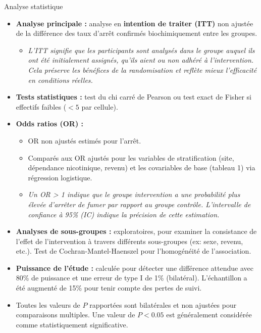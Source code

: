 \documentclass[aspectratio=169,xcolor=dvipsnames]{beamer}
\begin{document}
\begin{frame}{Analyse statistique}
    \begin{itemize}
        \item \textbf{Analyse principale :} analyse en \textbf{intention de traiter (ITT)} non ajustée de la différence des taux d'arrêt confirmés biochimiquement entre les groupes.
            \begin{itemize}
                \item \textit{L'ITT signifie que les participants sont analysés dans le groupe auquel ils ont été initialement assignés, qu'ils aient ou non adhéré à l'intervention. Cela préserve les bénéfices de la randomisation et reflète mieux l'efficacité en conditions réelles.}
            \end{itemize}
        \item \textbf{Tests statistiques :} test du chi carré de Pearson ou test exact de Fisher si effectifs faibles ($<5$ par cellule).
        \item \textbf{Odds ratios (OR) :}
            \begin{itemize}
                \item OR non ajustés estimés pour l'arrêt.
                \item Comparés aux OR ajustés pour les variables de stratification (site, dépendance nicotinique, revenu) et les covariables de base (tableau 1) via régression logistique.
                \item \textit{Un OR > 1 indique que le groupe intervention a une probabilité plus élevée d'arrêter de fumer par rapport au groupe contrôle. L'intervalle de confiance à 95\% (IC) indique la précision de cette estimation.}
            \end{itemize}
        \item \textbf{Analyses de sous-groupes :} exploratoires, pour examiner la consistance de l'effet de l'intervention à travers différents sous-groupes (ex: sexe, revenu, etc.). Test de Cochran-Mantel-Haenszel pour l'homogénéité de l'association.
        \item \textbf{Puissance de l'étude :} calculée pour détecter une différence attendue avec 80\% de puissance et une erreur de type I de 1\% (bilatéral). L'échantillon a été augmenté de 15\% pour tenir compte des pertes de suivi.
        \item Toutes les valeurs de $P$ rapportées sont bilatérales et non ajustées pour comparaisons multiples. Une valeur de $P < 0.05$ est généralement considérée comme statistiquement significative.
    \end{itemize}
\end{frame}
\end{document}

